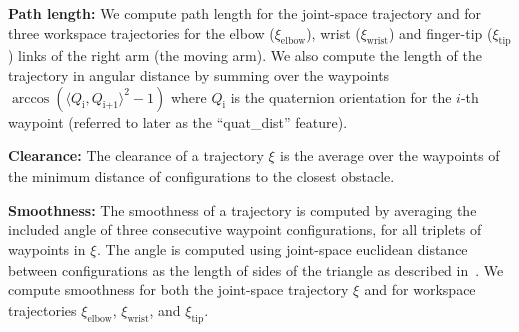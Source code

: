 \documentclass[letterpaper, 10 pt, conference]{ieeeconf}  %
\newcommand{\tj}[1]{\ensuremath{\xi_\text{#1}}}
\begin{document}
{\bf Path length:}
We compute path length for the joint-space trajectory and for three workspace trajectories for the elbow ($\xi_\text{elbow}$), wrist ($\xi_\text{wrist}$) and finger-tip ($\xi_\text{tip}$) links of the right arm (the moving arm). We also compute the length of the trajectory in angular distance by summing over the waypoints $\arccos( \langle Q_\text{i},Q_\text{i+1}\rangle^2-1 )$ where $Q_\text{i}$ is the quaternion orientation for the $i$-th waypoint (referred to later as the ``quat\_dist'' feature).

{\bf Clearance:}
The clearance of a trajectory \tj{} is the average over the waypoints of the minimum distance of configurations to the closest obstacle.

{\bf Smoothness:}
The smoothness of a trajectory is computed by averaging the included angle of three consecutive waypoint configurations, for all triplets of waypoints in \tj{}. The angle is computed using joint-space euclidean distance between configurations as the length of sides of the triangle as described in~\cite{cohen2012generic}.
We compute smoothness for both the joint-space trajectory \tj{} and for workspace trajectories $\xi_\text{elbow}$, $\xi_\text{wrist}$, and $\xi_\text{tip}$.
\end{document}

